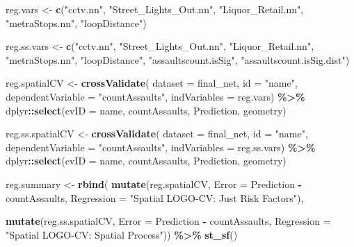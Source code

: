 \documentclass[
]{article}
\newenvironment{Shaded}{\begin{snugshade}}{\end{snugshade}}
\newcommand{\AttributeTok}[1]{\textcolor[rgb]{0.13,0.29,0.53}{#1}}
\newcommand{\FunctionTok}[1]{\textcolor[rgb]{0.13,0.29,0.53}{\textbf{#1}}}
\newcommand{\NormalTok}[1]{#1}
\newcommand{\OtherTok}[1]{\textcolor[rgb]{0.56,0.35,0.01}{#1}}
\newcommand{\SpecialCharTok}[1]{\textcolor[rgb]{0.81,0.36,0.00}{\textbf{#1}}}
\newcommand{\StringTok}[1]{\textcolor[rgb]{0.31,0.60,0.02}{#1}}
\begin{document}
\begin{Shaded}
\begin{Highlighting}[]
\NormalTok{reg.vars }\OtherTok{\textless{}{-}} \FunctionTok{c}\NormalTok{(}\StringTok{"cctv.nn"}\NormalTok{, }\StringTok{"Street\_Lights\_Out.nn"}\NormalTok{, }\StringTok{"Liquor\_Retail.nn"}\NormalTok{,}
              \StringTok{"metraStops.nn"}\NormalTok{, }\StringTok{"loopDistance"}\NormalTok{)}

\NormalTok{reg.ss.vars }\OtherTok{\textless{}{-}} \FunctionTok{c}\NormalTok{(}\StringTok{"cctv.nn"}\NormalTok{, }\StringTok{"Street\_Lights\_Out.nn"}\NormalTok{, }\StringTok{"Liquor\_Retail.nn"}\NormalTok{,}
                 \StringTok{"metraStops.nn"}\NormalTok{, }\StringTok{"loopDistance"}\NormalTok{, }\StringTok{"assaultscount.isSig"}\NormalTok{,}
                 \StringTok{"assaultscount.isSig.dist"}\NormalTok{)}

\NormalTok{reg.spatialCV }\OtherTok{\textless{}{-}} \FunctionTok{crossValidate}\NormalTok{(}
  \AttributeTok{dataset =}\NormalTok{ final\_net,}
  \AttributeTok{id =} \StringTok{"name"}\NormalTok{,}
  \AttributeTok{dependentVariable =} \StringTok{"countAssaults"}\NormalTok{,}
  \AttributeTok{indVariables =}\NormalTok{ reg.vars) }\SpecialCharTok{\%\textgreater{}\%}
\NormalTok{    dplyr}\SpecialCharTok{::}\FunctionTok{select}\NormalTok{(}\AttributeTok{cvID =}\NormalTok{ name, countAssaults, Prediction, geometry)}

\NormalTok{reg.ss.spatialCV }\OtherTok{\textless{}{-}} \FunctionTok{crossValidate}\NormalTok{(}
  \AttributeTok{dataset =}\NormalTok{ final\_net,}
  \AttributeTok{id =} \StringTok{"name"}\NormalTok{,                           }
  \AttributeTok{dependentVariable =} \StringTok{"countAssaults"}\NormalTok{,}
  \AttributeTok{indVariables =}\NormalTok{ reg.ss.vars) }\SpecialCharTok{\%\textgreater{}\%}
\NormalTok{    dplyr}\SpecialCharTok{::}\FunctionTok{select}\NormalTok{(}\AttributeTok{cvID =}\NormalTok{ name, countAssaults, Prediction, geometry)}


\NormalTok{reg.summary }\OtherTok{\textless{}{-}} 
  \FunctionTok{rbind}\NormalTok{(}
    \FunctionTok{mutate}\NormalTok{(reg.spatialCV,    }\AttributeTok{Error =}\NormalTok{ Prediction }\SpecialCharTok{{-}}\NormalTok{ countAssaults,}
                             \AttributeTok{Regression =} \StringTok{"Spatial LOGO{-}CV: Just Risk Factors"}\NormalTok{),}
                             
    \FunctionTok{mutate}\NormalTok{(reg.ss.spatialCV, }\AttributeTok{Error =}\NormalTok{ Prediction }\SpecialCharTok{{-}}\NormalTok{ countAssaults,}
                             \AttributeTok{Regression =} \StringTok{"Spatial LOGO{-}CV: Spatial Process"}\NormalTok{)) }\SpecialCharTok{\%\textgreater{}\%}
    \FunctionTok{st\_sf}\NormalTok{() }
\end{Highlighting}
\end{Shaded}
\end{document}
